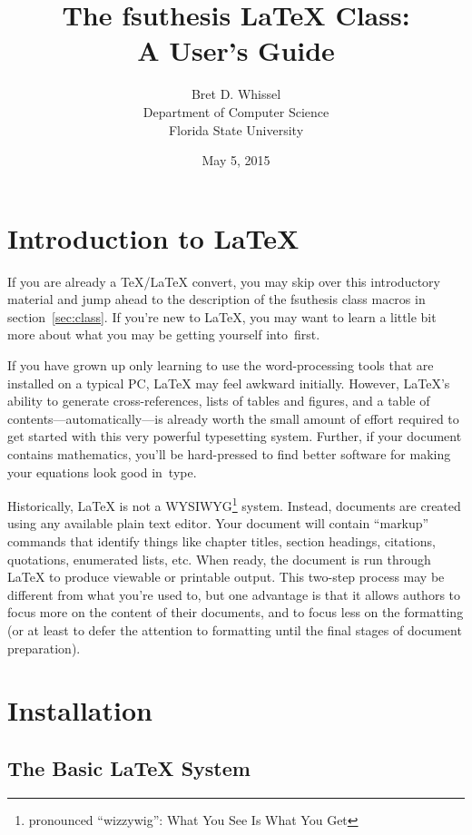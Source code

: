 \documentclass[11pt,letterpaper]{ltxdockit}[2011/03/25]
\title{The \textsf{fsuthesis} \LaTeX{} Class:\\
  A User's Guide}
\author{Bret D. Whissel\\Department of Computer Science\\Florida State University}
\date{May 5, 2015}
\newcommand*{\acro}[1]{{\small\textsc{#1}}}
\newcommand*{\pkg}[1]{\textsf{#1}}
\newcommand*{\fsuth}{\pkg{fsuthesis}}
\renewcommand{\-}{\discretionary{}{}{}}
\begin{document}
\maketitle

\tableofcontents

\section{Introduction to \LaTeX}
\label{sec:intro}

If you are already a \TeX/\LaTeX{} convert, you may skip over this
introductory material and jump ahead to the description of the
\fsuth{} class macros in section~\ref{sec:class}.  If you're new to
\LaTeX, you may want to learn a little bit more about what you may be
getting yourself into~first.

If you have grown up only learning to use the word-processing tools
that are installed on a typical PC, \LaTeX{} may feel awkward
initially.  However, \LaTeX's ability to generate cross-references,
lists of tables and figures, and a table of
contents---automatically---is already worth the small amount of effort
required to get started with this very powerful typesetting system.
Further, if your document contains mathematics, you'll be hard-pressed
to find better software for making your equations look good in~type.

Historically, \LaTeX{} is not a \acro{WYSIWYG}\footnote{pronounced
  ``wizzywig'': What You See Is What You Get} system.  Instead,
documents are created using any available plain text editor.  Your
document will contain ``markup'' commands that identify things like
chapter titles, section headings, citations, quotations, enumerated
lists, etc.  When ready, the document is run through \LaTeX{} to
produce viewable or printable output.  This two-step process may be
different from what you're used to, but one advantage is that it
allows authors to focus more on the content of their documents, and to
focus less on the formatting (or at least to defer the attention to
formatting until the final stages of document preparation).

\section{Installation}%
%
\label{sec:install}

\subsection{The Basic \LaTeX{} System}
\end{document}
